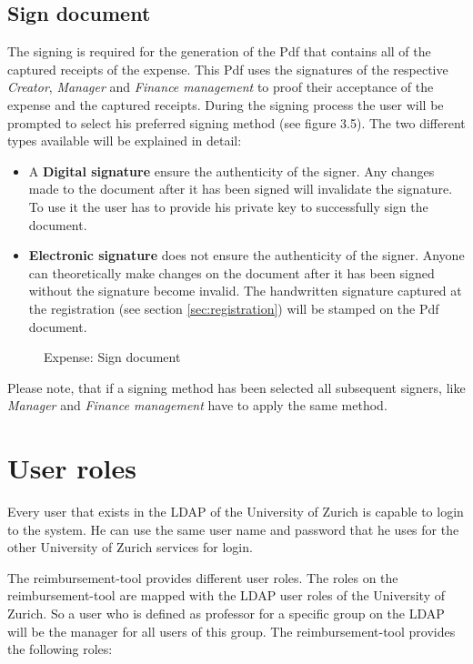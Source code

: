 \subsection{Sign document}
\label{sec:signing}
The signing is required for the generation of the Pdf that contains all of the captured receipts of the expense. This Pdf uses the signatures of the respective \textit{Creator}, \textit{Manager} and \textit{Finance management} to proof their acceptance of the expense and the captured receipts. During the signing process the user will be prompted to select his preferred signing method (see figure 3.5). The two different types available will be explained in detail:
\begin{itemize}
    \item A \textbf{Digital signature} ensure the authenticity of the signer. Any changes made to the document after it has been signed will invalidate the signature. To use it the user has to provide his private key to successfully sign the document.
    \item \textbf{Electronic signature} does not ensure the authenticity of the signer. Anyone can theoretically make changes on the document after it has been signed without the signature become invalid. The handwritten signature captured at the registration (see section \ref{sec:registration}) will be stamped on the Pdf document.
\end{itemize}

\begin{figure}[H]
    \centering
    \caption{Expense: Sign document}
    \label{fig:expense-sign}
\end{figure}

Please note, that if a signing method has been selected all subsequent signers, like \textit{Manager} and \textit{Finance management} have to apply the same method.


\section{User roles}
\label{user-roles}

Every user that exists in the LDAP of the University of Zurich is capable to login to the system. He can use the same user name and password that he uses for the other University of Zurich services for login.

The reimbursement-tool provides different user roles. The roles on the reimbursement-tool are mapped with the LDAP user roles of the University of Zurich. So a user who is defined as professor for a specific group on the LDAP will be the manager for all users of this group. The reimbursement-tool provides the following roles:

